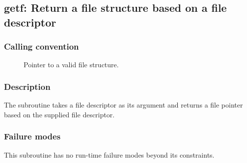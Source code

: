 \clearpage
{}
{}
\label{subr:getf}
\subsection*{getf: Return a file structure based on a file descriptor}

\subsubsection*{Calling convention}

\begin{description}
\item[] Pointer to a valid file structure.
\end{description}

\subsubsection*{Description}

The  subroutine takes a file descriptor as its
argument and returns a file pointer based on the supplied file
descriptor.

\subsubsection*{Failure modes}

This subroutine has no run-time failure modes beyond its constraints.
